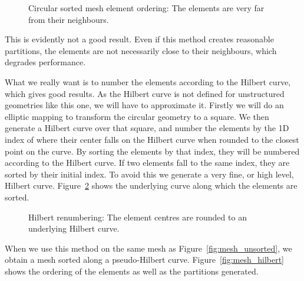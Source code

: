 \begin{figure}[H]
	\centering
	
	\caption{Circular sorted mesh element ordering: The elements are very far from their neighbours.}\label{fig:mesh_circular_ordering}
\end{figure}

This is evidently not a good result. Even if this method creates reasonable partitions, the elements
are not necessarily close to their neighbours, which degrades performance.

What we really want is to number the elements according to the Hilbert curve, which gives good
results. As the Hilbert curve is not defined for unstructured geometries like this one, we will have
to approximate it. Firstly we will do an elliptic mapping to transform the circular geometry to a
square. We then generate a Hilbert curve over that square, and number the elements by the 1D index
of where their center falls on the Hilbert curve when rounded to the closest point on the curve. By
sorting the elements by that index, they will be numbered according to the Hilbert curve. If two
elements fall to the same index, they are sorted by their initial index. To avoid this we generate a
very fine, or high level, Hilbert curve. Figure~\ref{fig:hilbert_renumbering} shows the underlying
curve along which the elements are sorted.

\begin{figure}[H]
	\centering
	
	\caption{Hilbert renumbering: The element centres are rounded to an underlying Hilbert curve.}\label{fig:hilbert_renumbering}
\end{figure}

When we use this method on the same mesh as Figure~\ref{fig:mesh_unsorted}, we obtain a mesh sorted
along a pseudo-Hilbert curve. Figure~\ref{fig:mesh_hilbert} shows the ordering of the elements as
well as the partitions generated.

